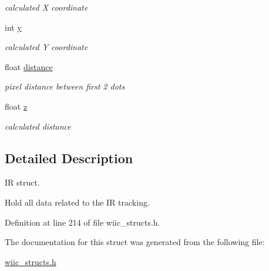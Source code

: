 \begin{DoxyCompactItemize}
\begin{DoxyCompactList}\small\item\em calculated X coordinate \end{DoxyCompactList}\item 
\hypertarget{structir__t_aecf2c4663aab868d326caeb7ffd01229}{int \hyperlink{structir__t_aecf2c4663aab868d326caeb7ffd01229}{y}}\label{structir__t_aecf2c4663aab868d326caeb7ffd01229}

\begin{DoxyCompactList}\small\item\em calculated Y coordinate \end{DoxyCompactList}\item 
\hypertarget{structir__t_ae964cb719e73986be124cf190d66d44d}{float \hyperlink{structir__t_ae964cb719e73986be124cf190d66d44d}{distance}}\label{structir__t_ae964cb719e73986be124cf190d66d44d}

\begin{DoxyCompactList}\small\item\em pixel distance between first 2 dots \end{DoxyCompactList}\item 
\hypertarget{structir__t_a94c67dc38b051479b8d786449449c864}{float \hyperlink{structir__t_a94c67dc38b051479b8d786449449c864}{z}}\label{structir__t_a94c67dc38b051479b8d786449449c864}

\begin{DoxyCompactList}\small\item\em calculated distance \end{DoxyCompactList}\end{DoxyCompactItemize}


\subsection{Detailed Description}
I\-R struct. 

Hold all data related to the I\-R tracking. 

Definition at line 214 of file wiic\-\_\-structs.\-h.



The documentation for this struct was generated from the following file\-:\begin{DoxyCompactItemize}
\item 
\hyperlink{wiic__structs_8h}{wiic\-\_\-structs.\-h}\end{DoxyCompactItemize}
